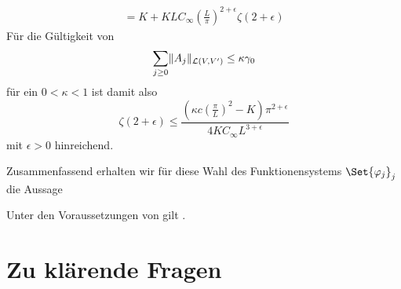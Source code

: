 \begin{Satz}
\begin{Beweis}
\begin{align}
            = K +  K L C_{\infty} \left( \frac{L}{\pi} \right)^{2+\epsilon}\zeta(2 + \epsilon)
        \end{align}
        Für die Gültigkeit von
        \begin{equation}
            \sum_{j \geq 0} \lVert A_{j}\rVert_{\mathcal L(V, V')} \leq \kappa \gamma_{0}
        \end{equation}
        für ein $0 < \kappa < 1$ ist damit also
        \begin{equation}
            \zeta(2 + \epsilon) \leq \frac{(\kappa c \left( \frac{\pi}{L}  \right)^{2}  - K) \pi^{2 + \epsilon}}{4 K C_{\infty} L^{3 + \epsilon}}
        \end{equation}
        mit $\epsilon > 0$ hinreichend.
    \end{Beweis}
\end{Satz}

Zusammenfassend erhalten wir für diese Wahl des Funktionensystems $\Set{ \varphi_{j} }_{j}$ die Aussage

\begin{Korollar}
    Unter den Voraussetzungen von  gilt .
\end{Korollar}



\clearpage
\section{Zu klärende Fragen} %
\label{sub:zu_kl_rende_fragen}

